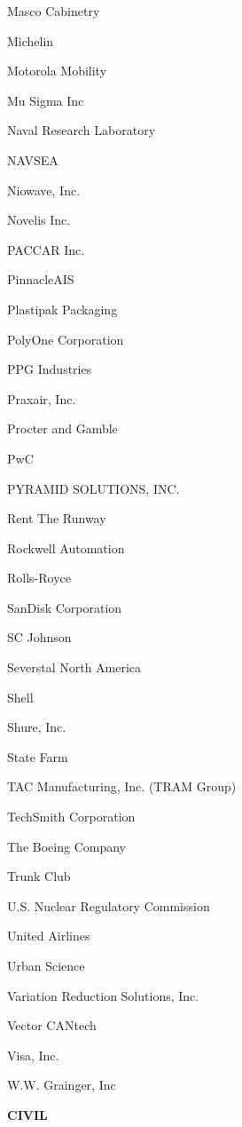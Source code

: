 \documentclass[twoside]{article}
\begin{document}
\begin{center}
\begin{multicols}{5}
\begin{FlushLeft}
\begin{compactitem}
\item Masco Cabinetry
\item Michelin
\item Motorola Mobility
\item Mu Sigma Inc
\item Naval Research Laboratory
\item NAVSEA
\item Niowave, Inc.
\item Novelis Inc.
\item PACCAR Inc.
\item PinnacleAIS
\item Plastipak Packaging
\item PolyOne Corporation
\item PPG Industries
\item Praxair, Inc.
\item Procter and Gamble
\item PwC
\item PYRAMID SOLUTIONS, INC.
\item Rent The Runway
\item Rockwell Automation
\item Rolls-Royce
\item SanDisk Corporation
\item SC Johnson
\item Severstal North America
\item Shell
\item Shure, Inc.
\item State Farm
\item TAC Manufacturing, Inc. (TRAM Group)
\item TechSmith Corporation
\item The Boeing Company
\item Trunk Club
\item U.S. Nuclear Regulatory Commission
\item United Airlines
\item Urban Science
\item Variation Reduction Solutions, Inc.
\item Vector CANtech
\item Visa, Inc.
\item W.W. Grainger, Inc
\end{compactitem}
        \end{FlushLeft}
        \vspace{1em}
        {\fontsize{14}{16}\selectfont \bf CIVIL}\\
        \vspace{-1em}

\end{multicols}
\end{center}
\end{document}
